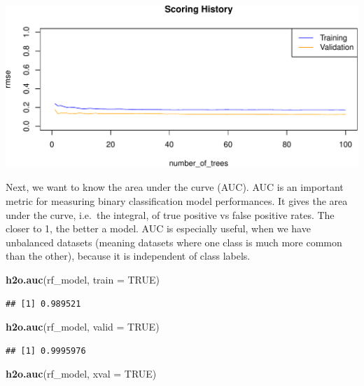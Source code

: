 \documentclass[]{article}
\newenvironment{Shaded}{\begin{snugshade}}{\end{snugshade}}
\newcommand{\KeywordTok}[1]{\textcolor[rgb]{0.13,0.29,0.53}{\textbf{{#1}}}}
\newcommand{\DataTypeTok}[1]{\textcolor[rgb]{0.13,0.29,0.53}{{#1}}}
\newcommand{\OtherTok}[1]{\textcolor[rgb]{0.56,0.35,0.01}{{#1}}}
\newcommand{\NormalTok}[1]{{#1}}
\begin{document}
\begin{center}\includegraphics{webinar_code_files/figure-latex/unnamed-chunk-47-1} \end{center}

Next, we want to know the area under the curve (AUC). AUC is an
important metric for measuring binary classification model performances.
It gives the area under the curve, i.e.~the integral, of true positive
vs false positive rates. The closer to 1, the better a model. AUC is
especially useful, when we have unbalanced datasets (meaning datasets
where one class is much more common than the other), because it is
independent of class labels.

\begin{Shaded}
\begin{Highlighting}[]
\KeywordTok{h2o.auc}\NormalTok{(rf_model, }\DataTypeTok{train =} \OtherTok{TRUE}\NormalTok{)}
\end{Highlighting}
\end{Shaded}

\begin{verbatim}
## [1] 0.989521
\end{verbatim}

\begin{Shaded}
\begin{Highlighting}[]
\KeywordTok{h2o.auc}\NormalTok{(rf_model, }\DataTypeTok{valid =} \OtherTok{TRUE}\NormalTok{)}
\end{Highlighting}
\end{Shaded}

\begin{verbatim}
## [1] 0.9995976
\end{verbatim}

\begin{Shaded}
\begin{Highlighting}[]
\KeywordTok{h2o.auc}\NormalTok{(rf_model, }\DataTypeTok{xval =} \OtherTok{TRUE}\NormalTok{)}
\end{Highlighting}
\end{Shaded}
\end{document}
